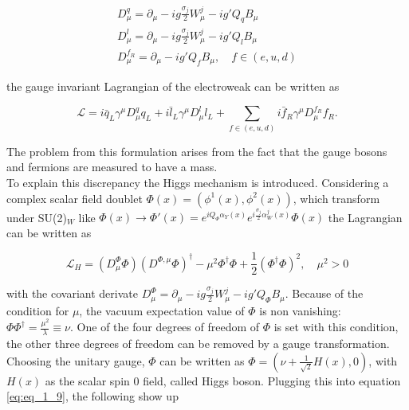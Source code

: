 \begin{equation}
	\label{eq:eq_1_7}
	\begin{split}
		D^{q}_{\mu} = \partial_{\mu}  - ig\frac{\sigma_{j}}{2}W^{j}_{\mu} - ig'Q_{q}B_{\mu} \\
		D^{l}_{\mu} = \partial_{\mu}  - ig\frac{\sigma_{j}}{2}W^{j}_{\mu} - ig'Q_{l}B_{\mu} \\
		D^{f_R}_{\mu} = \partial_{\mu}  - ig'Q_{f}B_{\mu}, \quad f \in (e, u, d)
	\end{split}
\end{equation}

the gauge invariant Lagrangian of the electroweak can be written as 

\begin{equation}
	\label{eq:eq_1_8}
	\mathcal{L} = i\bar{q}_{L}\gamma^{\mu}D_{\mu}^{q}q_{L} + i\bar{l}_{L}\gamma^{\mu}D_{\mu}^{l}l_{L} + \sum_{f \in (e, u, d)} i\bar{f}_{R}\gamma^{\mu}D^{f_R}_{\mu}f_{R}.
\end{equation}

The problem from this formulation arises from the fact that the gauge bosons and fermions are measured to have a mass. \\

To explain this discrepancy the Higgs mechanism \cite{HIGGS} is introduced. Considering a complex scalar field doublet $\Phi(x) = (\phi^{1}(x), \phi^{2}(x))$, which transform under SU(2)$_{W}$ like $\Phi(x) \rightarrow \Phi'(x) = e^{iQ_{\Phi} \alpha_{Y}(x)} e^{i\frac{\sigma_{j}}{2}\alpha^{j}_{W}(x)}\Phi(x)$ the Lagrangian can be written as

\begin{equation}
	\label{eq:eq_1_9}
	\mathcal{L}_{H} = (D^{\Phi}_{\mu}\Phi)(D^{\Phi, \mu}\Phi)^{\dagger} - \mu^2\Phi^{\dagger}\Phi + \frac{1}{2}(\Phi^{\dagger}\Phi)^2, \quad \mu^2 > 0
\end{equation}

with the covariant derivate $D^{\Phi}_{\mu} = \partial_{\mu}  - ig\frac{\sigma_{j}}{2}W^{j}_{\mu} - ig'Q_{\Phi}B_{\mu}$. Because of the condition for $\mu$, the vacuum expectation value of $\Phi$ is non vanishing: $\Phi\Phi^{\dagger} = \frac{\mu^2}{\lambda} \equiv \nu$. One of the four degrees of freedom of $\Phi$ is set with this condition, the other three degrees of freedom can be removed by a gauge transformation. Choosing the unitary gauge, $\Phi$ can be written as $\Phi = (\nu + \frac{1}{\sqrt{2}}H(x), 0)$, with $H(x)$ as the scalar spin 0 field, called Higgs boson. Plugging this into equation \ref{eq:eq_1_9}, the following show up

